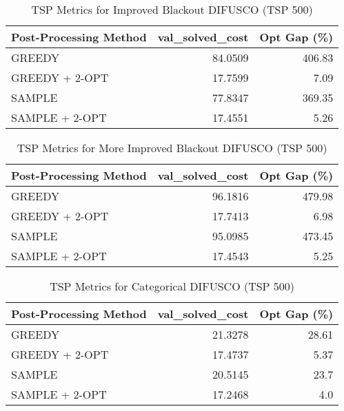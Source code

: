 \begin{table}[H]
    \centering
    \caption{TSP Metrics for Improved Blackout DIFUSCO (TSP 500)}
    \begin{tabular}{lrr}
        \toprule
        Post-Processing Method & val\_solved\_cost & Opt Gap (\%) \\
        \midrule
        GREEDY                 & 84.0509 & 406.83 \\
        GREEDY + 2-OPT         & 17.7599 & 7.09 \\
        SAMPLE                 & 77.8347 & 369.35 \\
        SAMPLE + 2-OPT         & 17.4551 & 5.26 \\
        \bottomrule
    \end{tabular}
\end{table}

\begin{table}[H]
    \centering
    \caption{TSP Metrics for More Improved Blackout DIFUSCO (TSP 500)}
    \begin{tabular}{lrr}
        \toprule
        Post-Processing Method & val\_solved\_cost & Opt Gap (\%) \\
        \midrule
        GREEDY                 & 96.1816 & 479.98 \\
        GREEDY + 2-OPT         & 17.7413 & 6.98 \\
        SAMPLE                 & 95.0985 & 473.45 \\
        SAMPLE + 2-OPT         & 17.4543 & 5.25 \\
        \bottomrule
    \end{tabular}
\end{table}

\begin{table}[H]
    \centering
    \caption{TSP Metrics for Categorical DIFUSCO (TSP 500)}
    \begin{tabular}{lrr}
        \toprule
        Post-Processing Method & val\_solved\_cost & Opt Gap (\%) \\
        \midrule
        GREEDY                 & 21.3278 & 28.61 \\
        GREEDY + 2-OPT         & 17.4737 & 5.37 \\
        SAMPLE                 & 20.5145 & 23.7 \\
        SAMPLE + 2-OPT         & 17.2468 & 4.0 \\
        \bottomrule
    \end{tabular}
\end{table}
